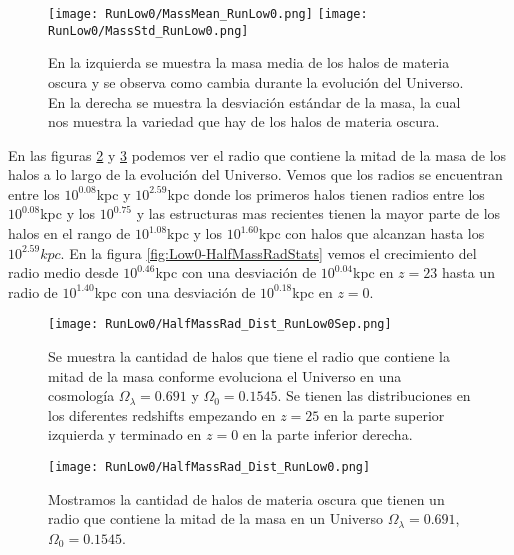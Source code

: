 \begin{figure}[H]
    \centering
    \texttt{[image: RunLow0/MassMean\_RunLow0.png]}
    \texttt{[image: RunLow0/MassStd\_RunLow0.png]}
    \caption[Media y desviación estándar de la distribución de masa]{\footnotesize En la izquierda se muestra la masa media de los halos de materia oscura y se observa como cambia durante la evolución del Universo. En la derecha se muestra la desviación estándar de la masa, la cual nos muestra la variedad que hay de los halos de materia oscura.}
    \label{fig:Low0-MassStats}
\end{figure}

En las figuras \ref{fig:Low0-HalfMassRadDistSep} y \ref{fig:Low0-HalfMassRadDist} podemos ver el radio que contiene la mitad de la masa de los halos a lo largo de la evolución del Universo. Vemos que los radios se encuentran entre los $10^{0.08}$kpc y $10^{2.59}$kpc donde los primeros halos tienen radios entre los $10^{0.08}$kpc y los $10^{0.75}$ y las estructuras mas recientes tienen la mayor parte de los halos en el rango de $10^{1.08}$kpc y los $10^{1.60}$kpc con halos que alcanzan hasta los $10^{2.59}kpc$. En la figura \ref{fig:Low0-HalfMassRadStats} vemos el crecimiento del radio medio desde $10^{0.46}$kpc con una desviación de $10^{0.04}$kpc en $z=23$ hasta un radio de $10^{1.40}$kpc con una desviación de $10^{0.18}$kpc en $z=0$.

\begin{figure}[H]
    \centering
    \texttt{[image: RunLow0/HalfMassRad\_Dist\_RunLow0Sep.png]}
    \caption[Radio que contiene la mitad de la masa]{\footnotesize Se muestra la cantidad de halos que tiene el radio que contiene la mitad de la masa conforme evoluciona el Universo en una cosmología $\Omega_\lambda = 0.691$ y $\Omega_0 = 0.1545$. Se tienen las distribuciones en los diferentes redshifts empezando en $z=25$ en la parte superior izquierda y terminado en $z=0$ en la parte inferior derecha.}
    \label{fig:Low0-HalfMassRadDistSep}
\end{figure}

\begin{figure}[H]
    \centering
    \texttt{[image: RunLow0/HalfMassRad\_Dist\_RunLow0.png]}
    \caption[Distribución del radio que contiene la mitad de la masa]{\footnotesize Mostramos la cantidad de halos de materia oscura que tienen un radio que contiene la mitad de la masa en un Universo $\Omega_\lambda = 0.691$, $\Omega_0 = 0.1545$.}
    \label{fig:Low0-HalfMassRadDist}
\end{figure}


